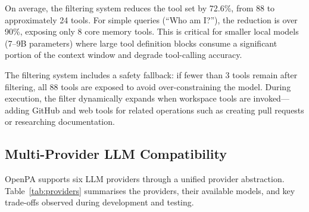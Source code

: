On average, the filtering system reduces the tool set by 72.6\%, from 88 to approximately 24 tools. For simple queries (``Who am I?''), the reduction is over 90\%, exposing only 8 core memory tools. This is critical for smaller local models (7--9B parameters) where large tool definition blocks consume a significant portion of the context window and degrade tool-calling accuracy.

The filtering system includes a safety fallback: if fewer than 3 tools remain after filtering, all 88 tools are exposed to avoid over-constraining the model. During execution, the filter dynamically expands when workspace tools are invoked---adding GitHub and web tools for related operations such as creating pull requests or researching documentation.

\subsection{Multi-Provider LLM Compatibility}

OpenPA supports six LLM providers through a unified provider abstraction. Table~\ref{tab:providers} summarises the providers, their available models, and key trade-offs observed during development and testing.

\begin{table}[H]
\centering
\caption{LLM provider compatibility and observed characteristics}
\label{tab:providers}
\end{table}


